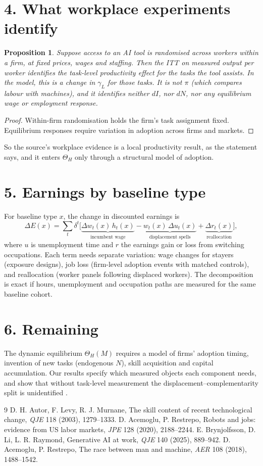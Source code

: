 \documentclass[11pt]{article}
\newtheorem{proposition}[theorem]{Proposition}
\theoremstyle{definition}
\begin{document}
\section*{4. What workplace experiments identify}
\begin{proposition}\label{prop:rct}
Suppose access to an AI tool is randomised across workers within a firm, at fixed prices, wages and staffing. Then the ITT on
measured output per worker identifies the task-level productivity effect for the tasks the tool assists. In the model, this
is a change in $\gamma_L$ for those tasks. It is not $\pi$ (which compares labour with machines), and it identifies neither
$dI$, nor $dN$, nor any equilibrium wage or employment response.
\end{proposition}
\begin{proof}
Within-firm randomisation holds the firm's task assignment fixed. Equilibrium responses require variation in adoption across
firms and markets.
\end{proof}
So the source's workplace evidence \cite{blr} is a local productivity result, as the statement says, and it enters
$\Theta_H$ only through a structural model of adoption.

\section*{5. Earnings by baseline type}
For baseline type $x$, the change in discounted earnings is
\[
 \Delta E(x)=\sum_t\delta^t\bigl[\underbrace{\Delta w_t(x)\,h_t(x)}_{\text{incumbent wage}}-\underbrace{w_t(x)\,\Delta u_t(x)}_{\text{displacement spells}}+\underbrace{\Delta r_t(x)}_{\text{reallocation}}\bigr],
\]
where $u$ is unemployment time and $r$ the earnings gain or loss from switching occupations. Each term needs separate
variation: wage changes for stayers (exposure designs), job loss (firm-level adoption events with matched controls), and
reallocation (worker panels following displaced workers). The decomposition is exact if hours, unemployment and occupation
paths are measured for the same baseline cohort.

\section*{6. Remaining}
The dynamic equilibrium $\Theta_H(M)$ requires a model of firms' adoption timing, invention of new tasks (endogenous $N$),
skill acquisition and capital accumulation. Our results specify which measured objects each component needs, and show that
without task-level measurement the displacement--complementarity split is unidentified \cite{alm,ar,blr}.

\begin{thebibliography}{9}
 D. H. Autor, F. Levy, R. J. Murnane, The skill content of recent technological change, \emph{QJE} 118 (2003), 1279--1333.
 D. Acemoglu, P. Restrepo, Robots and jobs: evidence from US labor markets, \emph{JPE} 128 (2020), 2188--2244.
 E. Brynjolfsson, D. Li, L. R. Raymond, Generative AI at work, \emph{QJE} 140 (2025), 889--942.
 D. Acemoglu, P. Restrepo, The race between man and machine, \emph{AER} 108 (2018), 1488--1542.
\end{thebibliography}
\end{document}
